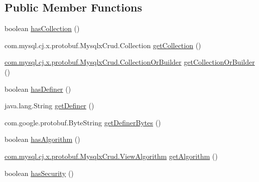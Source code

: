 \subsection*{Public Member Functions}
\begin{DoxyCompactItemize}
\item 
boolean \mbox{\hyperlink{interfacecom_1_1mysql_1_1cj_1_1x_1_1protobuf_1_1_mysqlx_crud_1_1_create_view_or_builder_a3f00eefab0652961f3a0f37529e2bd26}{has\+Collection}} ()
\item 
com.\+mysql.\+cj.\+x.\+protobuf.\+Mysqlx\+Crud.\+Collection \mbox{\hyperlink{interfacecom_1_1mysql_1_1cj_1_1x_1_1protobuf_1_1_mysqlx_crud_1_1_create_view_or_builder_a5e87029f9b75729d81db441da2c051be}{get\+Collection}} ()
\item 
\mbox{\hyperlink{interfacecom_1_1mysql_1_1cj_1_1x_1_1protobuf_1_1_mysqlx_crud_1_1_collection_or_builder}{com.\+mysql.\+cj.\+x.\+protobuf.\+Mysqlx\+Crud.\+Collection\+Or\+Builder}} \mbox{\hyperlink{interfacecom_1_1mysql_1_1cj_1_1x_1_1protobuf_1_1_mysqlx_crud_1_1_create_view_or_builder_afc597d5a5b89ad408477f85203c0dfd8}{get\+Collection\+Or\+Builder}} ()
\item 
boolean \mbox{\hyperlink{interfacecom_1_1mysql_1_1cj_1_1x_1_1protobuf_1_1_mysqlx_crud_1_1_create_view_or_builder_a92d1e534e3b05a44d5a9d79636dca826}{has\+Definer}} ()
\item 
java.\+lang.\+String \mbox{\hyperlink{interfacecom_1_1mysql_1_1cj_1_1x_1_1protobuf_1_1_mysqlx_crud_1_1_create_view_or_builder_a5a13e24a16a5929942113fa8908defad}{get\+Definer}} ()
\item 
com.\+google.\+protobuf.\+Byte\+String \mbox{\hyperlink{interfacecom_1_1mysql_1_1cj_1_1x_1_1protobuf_1_1_mysqlx_crud_1_1_create_view_or_builder_ab6d7c4c6c162b9db5a3a6006617a3ea4}{get\+Definer\+Bytes}} ()
\item 
boolean \mbox{\hyperlink{interfacecom_1_1mysql_1_1cj_1_1x_1_1protobuf_1_1_mysqlx_crud_1_1_create_view_or_builder_a52917aa43a3e12f89bd68dbea8f89908}{has\+Algorithm}} ()
\item 
\mbox{\hyperlink{enumcom_1_1mysql_1_1cj_1_1x_1_1protobuf_1_1_mysqlx_crud_1_1_view_algorithm}{com.\+mysql.\+cj.\+x.\+protobuf.\+Mysqlx\+Crud.\+View\+Algorithm}} \mbox{\hyperlink{interfacecom_1_1mysql_1_1cj_1_1x_1_1protobuf_1_1_mysqlx_crud_1_1_create_view_or_builder_a25890223ebd9f1c6d6ad3721693af4a9}{get\+Algorithm}} ()
\item 
boolean \mbox{\hyperlink{interfacecom_1_1mysql_1_1cj_1_1x_1_1protobuf_1_1_mysqlx_crud_1_1_create_view_or_builder_a5a8dfd32f487869438920200b9191f8a}{has\+Security}} ()

\end{DoxyCompactItemize}
